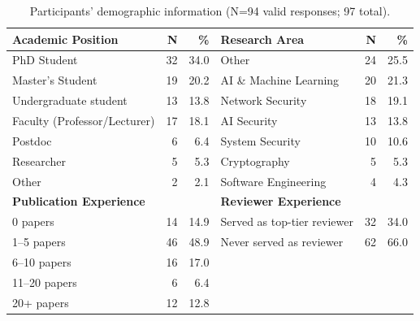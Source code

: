 \begin{table}[t]
  \centering
  \begin{threeparttable}
    \caption{Participants' demographic information (N=94 valid responses; 97 total).}
    \label{tab:demo_participants}
    \small
\begin{tabular}{p{6cm}rr|p{6cm}rr}
\toprule
\textbf{Academic Position} & \textbf{N} & \textbf{\%} & \textbf{Research Area} & \textbf{N} & \textbf{\%} \\
\midrule
\rowcolor{tableRowLight}
PhD Student & 32 & 34.0 & Other & 24 & 25.5 \\
Master's Student & 19 & 20.2 & AI \& Machine Learning & 20 & 21.3 \\
\rowcolor{tableRowLight}
Undergraduate student & 13 & 13.8 & Network Security & 18 & 19.1 \\
Faculty (Professor/Lecturer) & 17 & 18.1 & AI Security & 13 & 13.8 \\
\rowcolor{tableRowLight}
Postdoc & 6 & 6.4 & System Security & 10 & 10.6 \\
Researcher & 5 & 5.3 & Cryptography & 5 & 5.3 \\
\rowcolor{tableRowLight}
Other & 2 & 2.1 & Software Engineering & 4 & 4.3 \\
\midrule
\textbf{Publication Experience} & & & \textbf{Reviewer Experience} & & \\
\midrule
\rowcolor{tableRowLight}
0 papers & 14 & 14.9 & Served as top-tier reviewer & 32 & 34.0 \\
1--5 papers & 46 & 48.9 & Never served as reviewer & 62 & 66.0 \\
\rowcolor{tableRowLight}
6--10 papers & 16 & 17.0 &  &  &  \\
11--20 papers & 6 & 6.4 &  &  &  \\
\rowcolor{tableRowLight}
20+ papers & 12 & 12.8 &  &  &  \\
\bottomrule
\end{tabular}
  \end{threeparttable}
\end{table}

